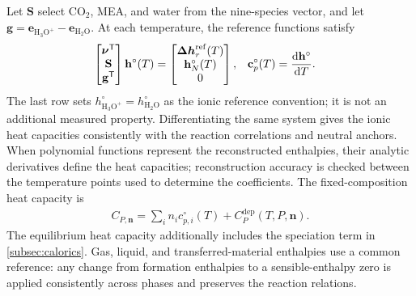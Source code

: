 Let $\mathbf S$ select CO$_2$, MEA, and water from the nine-species vector, and let $\mathbf g=\mathbf e_{\mathrm{H_3O^+}}-\mathbf e_{\mathrm{H_2O}}$.
At each temperature, the reference functions satisfy
\begin{align}
\begin{bmatrix}\boldsymbol\nu^{\mathsf T}\\\mathbf S\\\mathbf g^{\mathsf T}\end{bmatrix}
\mathbf h^\circ(T)
&=\begin{bmatrix}\boldsymbol{\Delta h}_{r}^{\mathrm{ref}}(T)\\\mathbf h_N^\circ(T)\\0\end{bmatrix},&
\mathbf c_p^\circ(T)&=\odv{\mathbf h^\circ}{T}.
\label{eq:caloric-reconstruction}
\end{align}
The last row sets $h_{\mathrm{H_3O^+}}^\circ=h_{\mathrm{H_2O}}^\circ$ as the ionic reference convention; it is not an additional measured property.
Differentiating the same system gives the ionic heat capacities consistently with the reaction correlations and neutral anchors.
When polynomial functions represent the reconstructed enthalpies, their analytic derivatives define the heat capacities; reconstruction accuracy is checked between the temperature points used to determine the coefficients.
The fixed-composition heat capacity is
\begin{align}
C_{P,\mathbf n}=\sum_i n_i c_{p,i}^\circ(T)+C_P^{\mathrm{dep}}(T,P,\mathbf n).
\end{align}
The equilibrium heat capacity additionally includes the speciation term in \cref{subsec:calorics}.
Gas, liquid, and transferred-material enthalpies use a common reference: any change from formation enthalpies to a sensible-enthalpy zero is applied consistently across phases and preserves the reaction relations.

